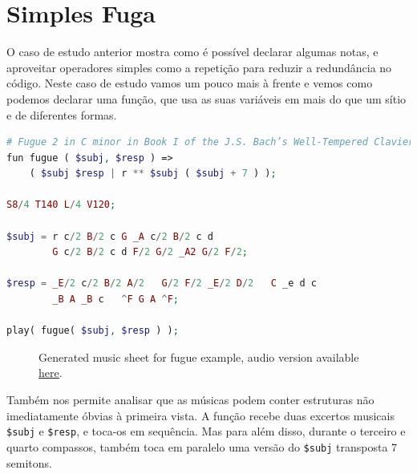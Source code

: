 \section{Simples Fuga}
O caso de estudo anterior mostra como é possível declarar algumas notas, e aproveitar operadores simples como a repetição para reduzir a redundância no código. Neste caso de estudo vamos um pouco mais à frente e vemos como podemos declarar uma função, que usa as suas variáveis em mais do que um sítio e de diferentes formas.
\begin{lstlisting}[caption=Exemplo da declaração da estrutura e conteúdo de uma simples fuga de duas vozes,language=PHP]
# Fugue 2 in C minor in Book I of the J.S. Bach’s Well-Tempered Clavier
fun fugue ( $subj, $resp ) => 
    ( $subj $resp | r ** $subj ( $subj + 7 ) );

S8/4 T140 L/4 V120;

$subj = r c/2 B/2 c G _A c/2 B/2 c d
        G c/2 B/2 c d F/2 G/2 _A2 G/2 F/2;

$resp = _E/2 c/2 B/2 A/2   G/2 F/2 _E/2 D/2   C _e d c
        _B A _B c   ^F G A ^F;

play( fugue( $subj, $resp ) );
\end{lstlisting}

\begin{figure}[ht]
  \centering
  {%
  \setlength{\fboxsep}{0pt}%
  \setlength{\fboxrule}{0pt}%
  }%
  \caption{Generated music sheet for fugue example, audio version available \href{https://drive.google.com/file/d/1dIfvnhhKn73Vpp0W6ss6RLsv6PQ_HFTF/view}{\underline{here}}\protect\footnotemark.}
  \label{fig:fugue}
\end{figure}

Também nos permite analisar que as músicas podem conter estruturas não imediatamente óbvias à primeira vista. A função recebe duas excertos musicais \texttt{\$subj} e \texttt{\$resp}, e toca-os em sequência. Mas para além disso, durante o terceiro e quarto compassos, também toca em paralelo uma versão do \texttt{\$subj} transposta 7 semitons. 

